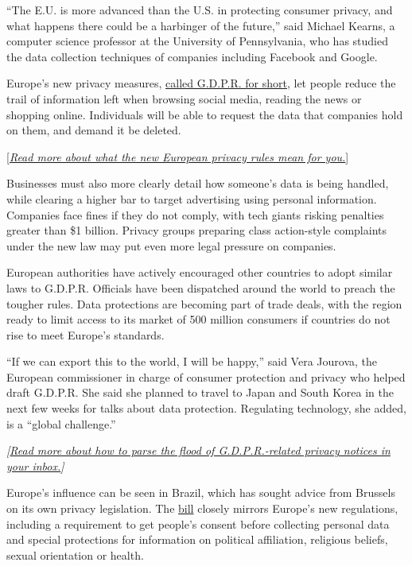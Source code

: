 ``The E.U. is more advanced than the U.S. in protecting consumer
privacy, and what happens there could be a harbinger of the future,''
said Michael Kearns, a computer science professor at the University of
Pennsylvania, who has studied the data collection techniques of
companies including Facebook and Google.

Europe's new privacy measures,
\href{https://www.nytimes.com/2018/05/06/technology/gdpr-european-privacy-law.html}{called
G.D.P.R. for short}, let people reduce the trail of information left
when browsing social media, reading the news or shopping online.
Individuals will be able to request the data that companies hold on
them, and demand it be deleted.

{[}\emph{\href{https://www.nytimes.com/2018/05/06/technology/gdpr-european-privacy-law.html}{Read
more about what the new European privacy rules mean for you.}}{]}

Businesses must also more clearly detail how someone's data is being
handled, while clearing a higher bar to target advertising using
personal information. Companies face fines if they do not comply, with
tech giants risking penalties greater than \$1 billion. Privacy groups
preparing class action-style complaints under the new law may put even
more legal pressure on companies.

European authorities have actively encouraged other countries to adopt
similar laws to G.D.P.R. Officials have been dispatched around the world
to preach the tougher rules. Data protections are becoming part of trade
deals, with the region ready to limit access to its market of 500
million consumers if countries do not rise to meet Europe's standards.

``If we can export this to the world, I will be happy,'' said Vera
Jourova, the European commissioner in charge of consumer protection and
privacy who helped draft G.D.P.R. She said she planned to travel to
Japan and South Korea in the next few weeks for talks about data
protection. Regulating technology, she added, is a ``global challenge.''

\emph{{[}\href{https://www.nytimes.com/2018/05/23/technology/personaltech/what-you-should-look-for-europe-data-law.html}{Read
more about how to parse the flood of G.D.P.R.-related privacy notices in
your inbox.}{]}}

Europe's influence can be seen in Brazil, which has sought advice from
Brussels on its own privacy legislation. The
\href{https://uk.practicallaw.thomsonreuters.com/4-520-1732?transitionType=Default\&contextData=(sc.Default)\&firstPage=true\&bhcp=1}{bill}
closely mirrors Europe's new regulations, including a requirement to get
people's consent before collecting personal data and special protections
for information on political affiliation, religious beliefs, sexual
orientation or health.

